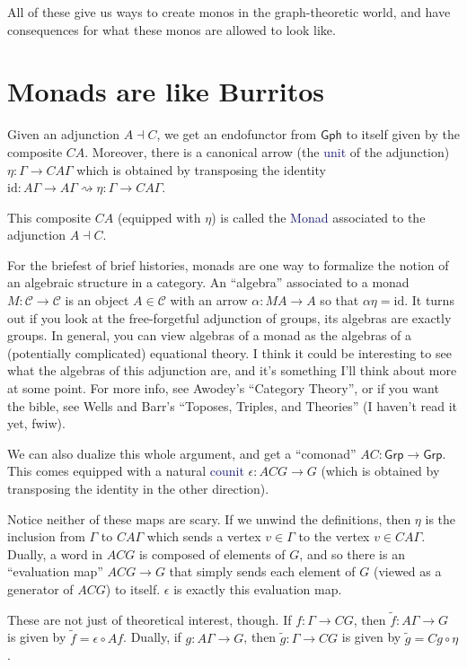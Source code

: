 \documentclass[12pt]{article}
\theoremstyle{definition}
\newcommand*{\catVarFont}[1]{\mathcal{#1}}
\newcommand{\catc}{\catVarFont{C}}
\newcommand*{\important}[1]{\textcolor{MidnightBlue}{#1}}
\begin{document}
All of these give us ways to create monos in the graph-theoretic world, and
have consequences for what these monos are allowed to look like. 

\section{Monads are like Burritos}

Given an adjunction $A \dashv C$, we get an endofunctor from $\mathsf{Gph}$
to itself given by the composite $CA$. Moreover, there is a canonical
arrow (the \important{unit} of the adjunction) $\eta : \Gamma \to CA\Gamma$ 
which is obtained by transposing the identity 
$\text{id} : A\Gamma \to A\Gamma \rightsquigarrow \eta : \Gamma \to CA\Gamma$.

This composite $CA$ (equipped with $\eta$)
is called the \important{Monad} associated to the adjunction $A \dashv C$.

For the briefest of brief histories, monads are one way to formalize the notion
of an algebraic structure in a category. An ``algebra'' associated to a monad
$M : \catc \to \catc$ is an object $A \in \catc$ with an arrow $\alpha : MA \to A$
so that $\alpha \eta = \text{id}$. It turns out if you look at 
the free-forgetful adjunction of groups, its algebras are exactly groups.
In general, you can view algebras of a monad as the algebras of a 
(potentially complicated) equational theory.
I think it could be interesting to see what the algebras of this adjunction are,
and it's something I'll think about more at some point. For more info, 
see Awodey's ``Category Theory'', or if you want the bible, see 
Wells and Barr's ``Toposes, Triples, and Theories'' (I haven't read it yet, fwiw).

We can also dualize this whole argument, and get a ``comonad'' 
$AC : \mathsf{Grp} \to \mathsf{Grp}$. This comes equipped with a natural
\important{counit} $\epsilon : ACG \to G$ (which is obtained by transposing the 
identity in the other direction).

Notice neither of these maps are scary. If we unwind the definitions, then
$\eta$ is the inclusion from $\Gamma$ to $CA\Gamma$ which sends a vertex $v \in \Gamma$
to the vertex $v \in CA\Gamma$. Dually, a word in $ACG$ is composed of
elements of $G$, and so there is an ``evaluation map'' $ACG \to G$ that 
simply sends each element of $G$ (viewed as a generator of $ACG$) to itself.
$\epsilon$ is exactly this evaluation map.

These are not just of theoretical interest, though. If 
$f : \Gamma \to CG$, then $\widetilde{f} : A\Gamma \to G$ is given by
$\widetilde{f} = \epsilon \circ Af$. Dually, if $g : A\Gamma \to G$,
then $\widetilde{g} : \Gamma \to CG$ is given by $\widetilde{g} = Cg \circ \eta$.
\end{document}
